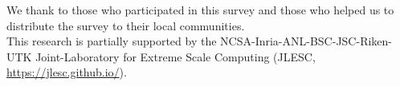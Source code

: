\documentclass[submit,techrep,noauthor,english]{ipsj}
\begin{document}
\begin{acknowledgment}
  We thank to those who participated in this survey and those who
  helped us to distribute the survey to their local communities.\\
  This research is partially supported by the
  NCSA-Inria-ANL-BSC-JSC-Riken-UTK Joint-Laboratory for Extreme Scale
  Computing (JLESC, \url{https://jlesc.github.io/}).
\end{acknowledgment}




\end{document}
